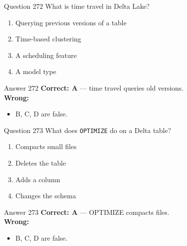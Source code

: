 \documentclass[aspectratio=169,11pt]{beamer}
\begin{document}
	\begin{frame}{Question 272}
		What is time travel in Delta Lake?
		\begin{enumerate}[label=\Alph*.]
			\item Querying previous versions of a table
			\item Time-based clustering
			\item A scheduling feature
			\item A model type
		\end{enumerate}
	\end{frame}
	\begin{frame}{Answer 272}
		\textbf{Correct: A} --- time travel queries old versions.\\
		\vspace{0.5em}
		\textbf{Wrong:}
		\begin{itemize}
			\item B, C, D are false.
		\end{itemize}
	\end{frame}
	
	\begin{frame}{Question 273}
		What does \texttt{OPTIMIZE} do on a Delta table?
		\begin{enumerate}[label=\Alph*.]
			\item Compacts small files
			\item Deletes the table
			\item Adds a column
			\item Changes the schema
		\end{enumerate}
	\end{frame}
	\begin{frame}{Answer 273}
		\textbf{Correct: A} --- OPTIMIZE compacts files.\\
		\vspace{0.5em}
		\textbf{Wrong:}
		\begin{itemize}
			\item B, C, D are false.
		\end{itemize}
	\end{frame}
	
\end{document}
